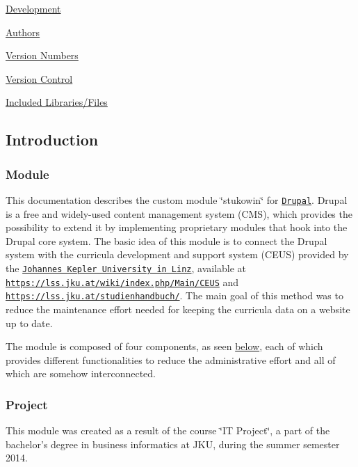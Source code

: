 \begin{DoxyEnumerate}
\begin{DoxyEnumerate}
\end{DoxyEnumerate}
\item \hyperlink{index_Development}{Development}
\begin{DoxyEnumerate}
\item \hyperlink{index_Authors}{Authors}
\item \hyperlink{index_versionnumbers}{Version Numbers}
\item \hyperlink{index_versioncontrol}{Version Control}
\end{DoxyEnumerate}
\item \hyperlink{index_Included}{Included Libraries/\+Files}
\end{DoxyEnumerate}\hypertarget{index_Introduction}{}\subsection{Introduction}\label{index_Introduction}
\hypertarget{index_Module_Intro}{}\subsubsection{Module}\label{index_Module_Intro}
This documentation describes the custom module \char`\"{}stukowin\char`\"{} for \href{http://drupal.org/}{\tt Drupal}. Drupal is a free and widely-\/used content management system (C\+M\+S), which provides the possibility to extend it by implementing proprietary modules that hook into the Drupal core system. The basic idea of this module is to connect the Drupal system with the curricula development and support system (C\+E\+U\+S) provided by the \href{http://jku.at}{\tt Johannes Kepler University in Linz}, available at \href{https://lss.jku.at/wiki/index.php/Main/CEUS}{\tt https\+://lss.\+jku.\+at/wiki/index.\+php/\+Main/\+C\+E\+U\+S} and \href{https://lss.jku.at/studienhandbuch/}{\tt https\+://lss.\+jku.\+at/studienhandbuch/}. The main goal of this method was to reduce the maintenance effort needed for keeping the curricula data on a website up to date.

The module is composed of four components, as seen \hyperlink{index_Modules}{below}, each of which provides different functionalities to reduce the administrative effort and all of which are somehow interconnected.\hypertarget{index_Project_Intro}{}\subsubsection{Project}\label{index_Project_Intro}
This module was created as a result of the course \char`\"{}\+I\+T Project\char`\"{}, a part of the bachelor's degree in business informatics at J\+K\+U, during the summer semester 2014.

